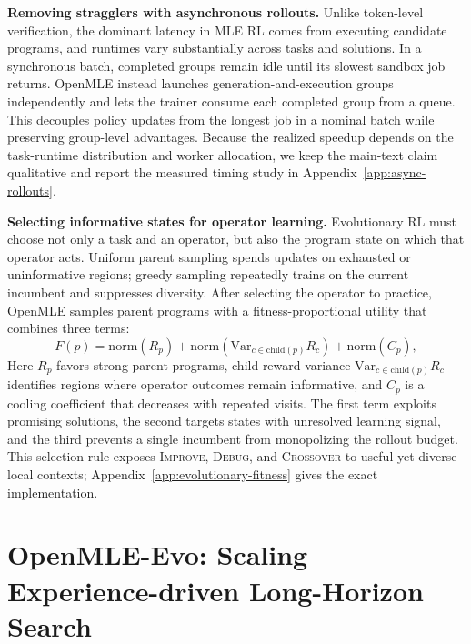 \textbf{Removing stragglers with asynchronous rollouts.}
Unlike token-level verification, the dominant latency in MLE RL comes from executing candidate programs, and runtimes vary substantially across tasks and solutions. In a synchronous batch, completed groups remain idle until its slowest sandbox job returns. OpenMLE instead launches generation-and-execution groups independently and lets the trainer consume each completed group from a queue. This decouples policy updates from the longest job in a nominal batch while preserving group-level advantages. Because the realized speedup depends on the task-runtime distribution and worker allocation, we keep the main-text claim qualitative and report the measured timing study in Appendix~\ref{app:async-rollouts}.

\textbf{Selecting informative states for operator learning.}
Evolutionary RL must choose not only a task and an operator, but also the program state on which that operator acts. Uniform parent sampling spends updates on exhausted or uninformative regions; greedy sampling repeatedly trains on the current incumbent and suppresses diversity. After selecting the operator to practice, OpenMLE samples parent programs with a fitness-proportional utility that combines three terms:
\begin{equation}
\label{eq:sample}
F(p) = \mathrm{norm}(R_p) + \mathrm{norm}(\mathrm{Var}_{c \in \mathrm{child}(p)} R_c) + \mathrm{norm}(C_p),
\end{equation}
Here $R_p$ favors strong parent programs, child-reward variance $\mathrm{Var}_{c \in \mathrm{child}(p)} R_c$  identifies regions where operator outcomes remain informative, and $C_p$ is a cooling coefficient that decreases with repeated visits. The first term exploits promising solutions, the second targets states with unresolved learning signal, and the third prevents a single incumbent from monopolizing the rollout budget. This selection rule exposes \textsc{Improve}, \textsc{Debug}, and \textsc{Crossover} to useful yet diverse local contexts; Appendix~\ref{app:evolutionary-fitness} gives the exact implementation.

\section{OpenMLE-Evo: Scaling Experience-driven Long-Horizon Search}
\label{sec:tts-harness}

